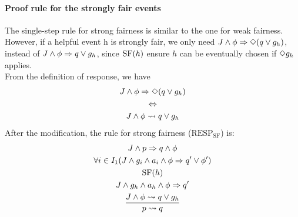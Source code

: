 \paragraph{Proof rule for the strongly fair events}
The single-step rule for strong fairness is similar to the one for weak fairness. However, if a helpful event {h} is strongly fair, we only need ${J}\wedge\phi\Rightarrow\Diamond({q}\vee{g_{h})}$, instead of ${J}\wedge\phi\Rightarrow{q}\vee{g_{h}}$, since $\mathrm{SF}(h)$ ensure ${h}$ can be eventually chosen if $\Diamond{g_{h}}$ applies. \\
From the definition of response, we have
\begin{gather*}
  {J}\wedge\phi\Rightarrow\Diamond({q}\vee{g_{h})}\\
  \Leftrightarrow\\
  {J}\wedge\phi\rightsquigarrow{{q}\vee{g_{h}}}
\end{gather*}
After the modification, the rule for strong fairness (\texttt{$\mathrm{RESP_{SF}}$}) is: 
\begin{gather*}
  {J}\wedge{p}\Rightarrow{q}\wedge\phi\\
  \forall{i}\in{I_1}({J}\wedge{g_{i}}\wedge{a_{i}}\wedge\phi\Rightarrow{q'}\vee\phi')\\
  \mathrm{SF}(h)\\
  {J}\wedge{g_{h}}\wedge{a_{h}}\wedge\phi\Rightarrow{q'}\\
  \frac{{J}\wedge\phi\rightsquigarrow{{q}\vee{g_{h}}}}{p\rightsquigarrow{q}}
\end{gather*}
